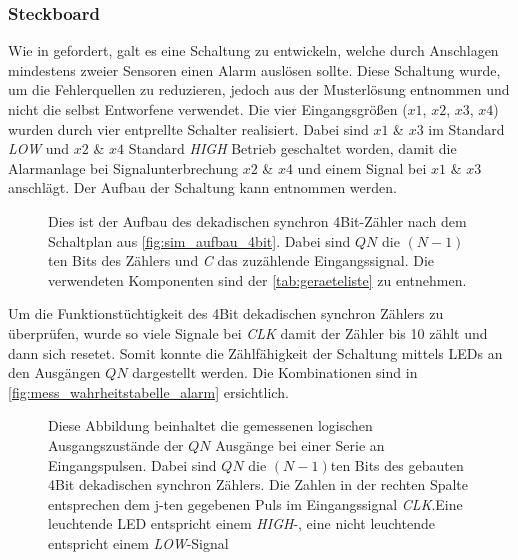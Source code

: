 \documentclass[12pt,english,ngerman]{scrartcl}
\begin{document}
\subsubsection{Steckboard}
Wie in  gefordert, galt es eine Schaltung
zu entwickeln, welche durch Anschlagen mindestens zweier Sensoren einen Alarm auslösen
sollte. Diese Schaltung wurde, um die Fehlerquellen zu reduzieren, jedoch aus der
Musterlösung entnommen und nicht die selbst Entworfene verwendet. Die vier
Eingangsgrößen ($x1$, $x2$, $x3$, $x4$) wurden durch vier entprellte
Schalter realisiert. Dabei sind $x1$ \& $x3$ im Standard \textit{LOW} und
$x2$ \& $x4$ Standard \textit{HIGH} Betrieb geschaltet worden, damit die
Alarmanlage bei Signalunterbrechung $x2$ \& $x4$ und einem Signal bei $x1$
\& $x3$ anschlägt. Der Aufbau der Schaltung kann 
entnommen werden.

\begin{figure}[H]
  \centering
  \caption{Dies ist der Aufbau des dekadischen synchron 4Bit-Zähler nach dem
  Schaltplan aus \autoref{fig:sim_aufbau_4bit}.
Dabei sind $QN$ die $(N-1)$ten Bits des Zählers und \textit{C} das zuzählende
Eingangssignal.
  Die verwendeten Komponenten
  sind der \autoref{tab:geraeteliste} zu entnehmen.}
  \label{fig:mess_aufbau_4bit}
\end{figure}

Um die Funktionstüchtigkeit des 4Bit dekadischen synchron Zählers zu
überprüfen, wurde so viele Signale bei \textit{CLK} damit der Zähler bis 10
zählt und dann sich resetet. Somit konnte die Zählfähigkeit der Schaltung
mittels LEDs an den Ausgängen $QN$ dargestellt werden. Die Kombinationen sind
in \autoref{fig:mess_wahrheitstabelle_alarm} ersichtlich.

\begin{figure}[H]
  \centering
  \caption{Diese Abbildung beinhaltet die gemessenen logischen Ausgangszustände
    der $QN$ Ausgänge bei einer Serie an Eingangspulsen. Dabei sind $QN$ die
    $(N-1)$ten Bits des gebauten 4Bit dekadischen synchron Zählers. Die Zahlen
    in der rechten Spalte entsprechen dem j-ten gegebenen Puls im
  Eingangssignal \textit{CLK}.Eine leuchtende LED entspricht einem
\textit{HIGH}-, eine nicht leuchtende entspricht einem \textit{LOW}-Signal}
  \label{fig:mess_wahrheitstabelle_alarm}
\end{figure}
\end{document}

